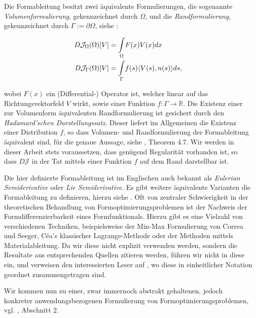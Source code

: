 Die Formableitung besitzt zwei äquivalente Formulierungen, die sogenannte \textit{Volumenformulierung}, gekennzeichnet durch $\Omega$, und die \textit{Randformulierung}, gekennzeichnet durch $\Gamma := \partial \Omega$, siehe \cite{bfgs2}:

\begin{equation}
\label{VolumenRandformulierung}
\begin{aligned}
	D\mathcal{J}_\Omega(\Omega)[V] &= \underset{\Omega}{\int}F(x)V(x)dx\\
	\vspace{0.5cm}
	D\mathcal{J}_\Gamma(\Omega)[V] &= \underset{\Gamma}{\int}f(s)\langle V(s),n(s)\rangle ds,
\end{aligned}
\end{equation}

wobei $F(x)$ ein (Differential-) Operator ist, welcher linear auf das Richtungsvektorfeld $V$ wirkt, sowie einer Funktion $f: \Gamma \rightarrow \mathbb{R}$. Die Existenz einer zur Volumenform äquivalenten Randformulierung ist gesichert durch den \textit{Hadamard'schen Darstellungssatz}. Dieser liefert im Allgemeinen die Existenz einer Distribution $f$, so dass Volumen- und Randformulierung der  Formableitung äquivalent sind, für die genaue Aussage, siehe \cite{shape_space}, Theorem 4.7. Wir werden in dieser Arbeit stets voraussetzen, dass genügend Regularität vorhanden ist, so dass $D\mathcal{J}$ in der Tat mittels einer Funktion $f$ auf dem Rand darstellbar ist.

Die hier definierte Formableitung ist im Englischen auch bekannt als \textit{Eulerian Semiderivative} oder \textit{Lie Semiderivative}. Es gibt weitere äquivalente Varianten die Formableitung zu definieren, hierzu siehe \cite{Shape_diff}. Oft von zentraler Schwierigkeit in der theoretischen Behandlung von Formoptimierungsproblemen ist der Nachweis der Formdifferenzierbarkeit eines Formfunktionals. Hierzu gibt es eine Vielzahl von verschiedenen Techniken, beispielsweise der Min-Max Formulierung von Correa und Seeger, Céa's klassischer Lagrange-Methode oder der Methoden mittels Materialableitung. Da wir diese nicht explizit verwenden werden, sondern die Resultate aus entsprechenden Quellen zitieren werden, führen wir nicht in diese ein, und verweisen den interessierten Leser auf \cite{Shape_diff}, wo diese in einheitlicher Notation geordnet zusammengetragen sind.

Wir kommen nun zu einer, zwar immernoch abstrakt gehaltenen, jedoch konkreter anwendungsbezogenen Formulierung von Formoptimierungsproblemen, vgl. \cite{LagrangeNewton}, Abschnitt 2.

